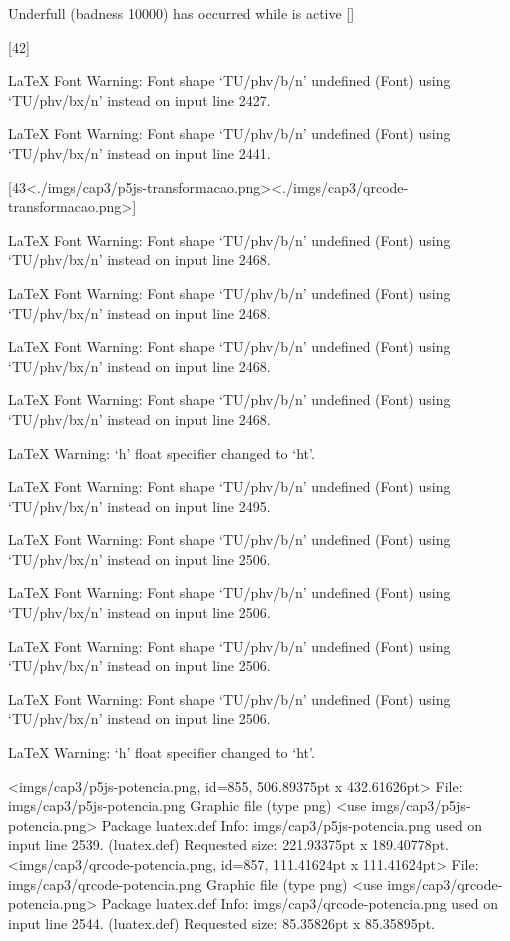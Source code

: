 Underfull \vbox (badness 10000) has occurred while \output is active []

[42]

LaTeX Font Warning: Font shape `TU/phv/b/n' undefined
(Font)              using `TU/phv/bx/n' instead on input line 2427.


LaTeX Font Warning: Font shape `TU/phv/b/n' undefined
(Font)              using `TU/phv/bx/n' instead on input line 2441.

[43<./imgs/cap3/p5js-transformacao.png><./imgs/cap3/qrcode-transformacao.png>]

LaTeX Font Warning: Font shape `TU/phv/b/n' undefined
(Font)              using `TU/phv/bx/n' instead on input line 2468.


LaTeX Font Warning: Font shape `TU/phv/b/n' undefined
(Font)              using `TU/phv/bx/n' instead on input line 2468.


LaTeX Font Warning: Font shape `TU/phv/b/n' undefined
(Font)              using `TU/phv/bx/n' instead on input line 2468.


LaTeX Font Warning: Font shape `TU/phv/b/n' undefined
(Font)              using `TU/phv/bx/n' instead on input line 2468.


LaTeX Warning: `h' float specifier changed to `ht'.


LaTeX Font Warning: Font shape `TU/phv/b/n' undefined
(Font)              using `TU/phv/bx/n' instead on input line 2495.


LaTeX Font Warning: Font shape `TU/phv/b/n' undefined
(Font)              using `TU/phv/bx/n' instead on input line 2506.


LaTeX Font Warning: Font shape `TU/phv/b/n' undefined
(Font)              using `TU/phv/bx/n' instead on input line 2506.


LaTeX Font Warning: Font shape `TU/phv/b/n' undefined
(Font)              using `TU/phv/bx/n' instead on input line 2506.


LaTeX Font Warning: Font shape `TU/phv/b/n' undefined
(Font)              using `TU/phv/bx/n' instead on input line 2506.


LaTeX Warning: `h' float specifier changed to `ht'.

<imgs/cap3/p5js-potencia.png, id=855, 506.89375pt x 432.61626pt>
File: imgs/cap3/p5js-potencia.png Graphic file (type png)
<use imgs/cap3/p5js-potencia.png>
Package luatex.def Info: imgs/cap3/p5js-potencia.png  used on input line 2539.
(luatex.def)             Requested size: 221.93375pt x 189.40778pt.
<imgs/cap3/qrcode-potencia.png, id=857, 111.41624pt x 111.41624pt>
File: imgs/cap3/qrcode-potencia.png Graphic file (type png)
<use imgs/cap3/qrcode-potencia.png>
Package luatex.def Info: imgs/cap3/qrcode-potencia.png  used on input line 2544.
(luatex.def)             Requested size: 85.35826pt x 85.35895pt.

